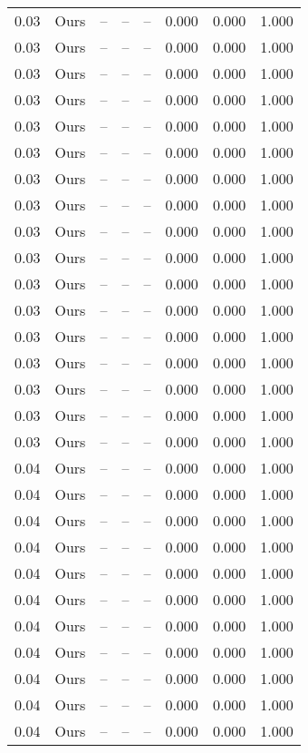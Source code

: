 \begin{table}[H]
\begin{tabular}{l c l l l}
0.03 & Ours & -- & -- & -- & 0.000 & 0.000 & 1.000 \\
0.03 & Ours & -- & -- & -- & 0.000 & 0.000 & 1.000 \\
0.03 & Ours & -- & -- & -- & 0.000 & 0.000 & 1.000 \\
0.03 & Ours & -- & -- & -- & 0.000 & 0.000 & 1.000 \\
0.03 & Ours & -- & -- & -- & 0.000 & 0.000 & 1.000 \\
0.03 & Ours & -- & -- & -- & 0.000 & 0.000 & 1.000 \\
0.03 & Ours & -- & -- & -- & 0.000 & 0.000 & 1.000 \\
0.03 & Ours & -- & -- & -- & 0.000 & 0.000 & 1.000 \\
0.03 & Ours & -- & -- & -- & 0.000 & 0.000 & 1.000 \\
0.03 & Ours & -- & -- & -- & 0.000 & 0.000 & 1.000 \\
0.03 & Ours & -- & -- & -- & 0.000 & 0.000 & 1.000 \\
0.03 & Ours & -- & -- & -- & 0.000 & 0.000 & 1.000 \\
0.03 & Ours & -- & -- & -- & 0.000 & 0.000 & 1.000 \\
0.03 & Ours & -- & -- & -- & 0.000 & 0.000 & 1.000 \\
0.03 & Ours & -- & -- & -- & 0.000 & 0.000 & 1.000 \\
0.03 & Ours & -- & -- & -- & 0.000 & 0.000 & 1.000 \\
0.03 & Ours & -- & -- & -- & 0.000 & 0.000 & 1.000 \\
0.04 & Ours & -- & -- & -- & 0.000 & 0.000 & 1.000 \\
0.04 & Ours & -- & -- & -- & 0.000 & 0.000 & 1.000 \\
0.04 & Ours & -- & -- & -- & 0.000 & 0.000 & 1.000 \\
0.04 & Ours & -- & -- & -- & 0.000 & 0.000 & 1.000 \\
0.04 & Ours & -- & -- & -- & 0.000 & 0.000 & 1.000 \\
0.04 & Ours & -- & -- & -- & 0.000 & 0.000 & 1.000 \\
0.04 & Ours & -- & -- & -- & 0.000 & 0.000 & 1.000 \\
0.04 & Ours & -- & -- & -- & 0.000 & 0.000 & 1.000 \\
0.04 & Ours & -- & -- & -- & 0.000 & 0.000 & 1.000 \\
0.04 & Ours & -- & -- & -- & 0.000 & 0.000 & 1.000 \\
0.04 & Ours & -- & -- & -- & 0.000 & 0.000 & 1.000 \\

\end{tabular}
\end{table}
